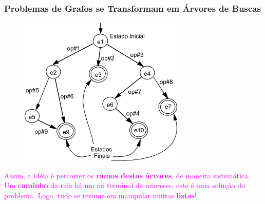 \begin{frame}[fragile]
\frametitle{Problemas de Grafos se Transformam em Árvores de Buscas}


\begin{figure}[!htb]
\centering
\includegraphics[width=0.7\textwidth, height=0.55\textheight]{figures/arv_buscas_finais.png}
\end{figure}

%
\begin{center}
\textcolor{magenta}{Assim, a idéia é percorrer os \textbf{ramos destas  árvores}, de maneira
sistemática. Um \textbf{caminho} da raiz há um nó terminal de interesse, este é uma solução do
problema. Logo, tudo se resume em manipular muitas \textbf{listas}!}
\end{center}

\end{frame}


